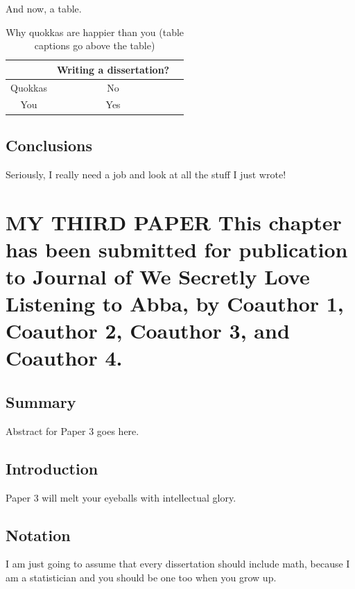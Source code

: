 \documentclass[english]{ucdenver-dissertation}
\makeatletter
\let\SF@@footnote\footnote
\def\footnote{\ifx\protect\@typeset@protect
    \expandafter\SF@@footnote
  \else
    \expandafter\SF@gobble@opt
  \fi
}
\edef\SF@gobble@opt{\noexpand\protect
  \expandafter\noexpand\csname SF@gobble@opt \endcsname}
\providecommand{\tabularnewline}{\\}
\makeatother
\begin{document}
And now, a table.

\begin{table}[H]
\caption{Why quokkas are happier than you (table captions go above the table)}
\begin{centering}
\begin{tabular}{ccc}
\hline 
 & Writing a dissertation?\tabularnewline
\hline 
Quokkas & No\tabularnewline
You & Yes\tabularnewline
\hline 
\end{tabular}
\par\end{centering}

\end{table}

\section{Conclusions}

Seriously, I really need a job and look at all the stuff I just wrote!

\newpage

\chapter{MY THIRD PAPER%
\footnote{This chapter has been submitted for publication to Journal of We Secretly Love Listening 
to Abba, by Coauthor 1, Coauthor 2, Coauthor 3, and Coauthor 4.%
}}


\section{Summary}

Abstract for Paper 3 goes here.


\section{Introduction}

Paper 3 will melt your eyeballs with intellectual glory.





\section{Notation}

I am just going to assume that every dissertation should include math,
because I am a statistician and you should be one too when you grow up.
\end{document}

